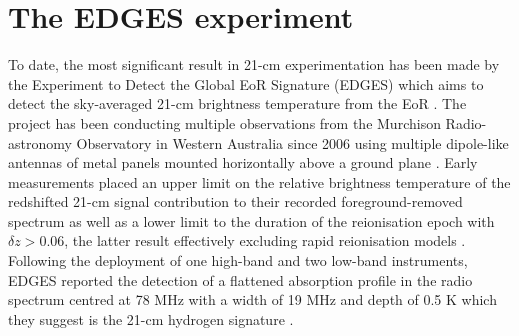 \section{The EDGES experiment}\label{sec:edges}
To date, the most significant result in 21-cm experimentation has been made by the Experiment to Detect the Global EoR Signature (EDGES) which aims to detect the sky-averaged 21-cm brightness temperature from the EoR \citep{edgesCal}. The project has been conducting multiple observations from the Murchison Radio-astronomy Observatory in Western Australia since 2006 \citep{edgesCal} using multiple dipole-like antennas of metal panels mounted horizontally above a ground plane \citep{edgesNature}. Early measurements placed an upper limit on the relative brightness temperature of the redshifted 21-cm signal contribution to their recorded foreground-removed spectrum \citep{edges2008} as well as a lower limit to the duration of the reionisation epoch with $\delta z > 0.06$, the latter result effectively excluding rapid reionisation models \citep{edges2010}. Following the deployment of one high-band and two low-band instruments, EDGES reported the detection of a flattened absorption profile in the radio spectrum centred at 78 MHz with a width of 19 MHz and depth of 0.5 K which they suggest is the 21-cm hydrogen signature \citep{edgesNature}.


